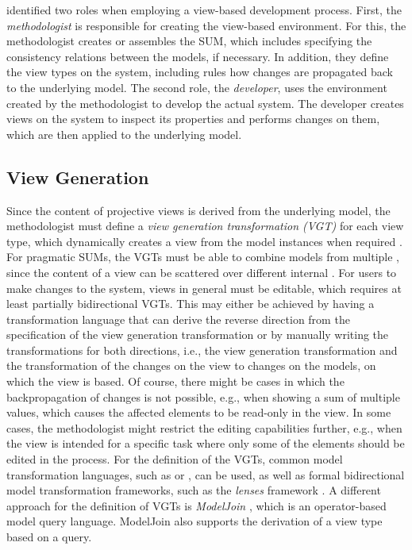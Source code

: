 \Textcite{atkinson_orthographic_2010} identified two roles when employing a view-based development process.
First, the \emph{methodologist} is responsible for creating the view-based environment.
For this, the methodologist creates or assembles the SUM, which includes specifying the consistency relations between the models, if necessary.
In addition, they define the view types on the system, including rules how changes are propagated back to the underlying model.
The second role, the \emph{developer}, uses the environment created by the methodologist to develop the actual system.
The developer creates views on the system to inspect its properties and performs changes on them, which are then applied to the underlying model.

\subsection{View Generation}
\label{sec:ViewGeneration}

Since the content of projective views is derived from the underlying model, the methodologist must define a \emph{view generation transformation (VGT)} for each view type, which dynamically creates a view from the model instances when required \autocite{tunjic_synchronization_2015}.
For pragmatic SUMs, the VGTs must be able to combine models from multiple \metamodels, since the content of a view can be scattered over different internal \metamodels \autocite{burger_flexible_2014}.
For users to make changes to the system, views in general must be editable, which requires at least partially bidirectional VGTs.
This may either be achieved by having a transformation language that can derive the reverse direction from the specification of the view generation transformation or by manually writing the transformations for both directions, i.e., the view generation transformation and the transformation of the changes on the view to changes on the models, on which the view is based.
Of course, there might be cases in which the backpropagation of changes is not possible, e.g., when showing a sum of multiple values, which causes the affected elements to be read-only in the view.
In some cases, the methodologist might restrict the editing capabilities further, e.g., when the view is intended for a specific task where only some of the elements should be edited in the process.
For the definition of the VGTs, common model transformation languages, such as \cite{omg_qvt} or \cite{eclipse_atl}, can be used, as well as formal bidirectional model transformation frameworks, such as the \emph{lenses} framework \autocite{foster_combinators_2007}.
A different approach for the definition of VGTs is \emph{ModelJoin} \autocite{burger_model-join_2016}, which is an operator-based model query language.
ModelJoin also supports the derivation of a view type based on a query.


